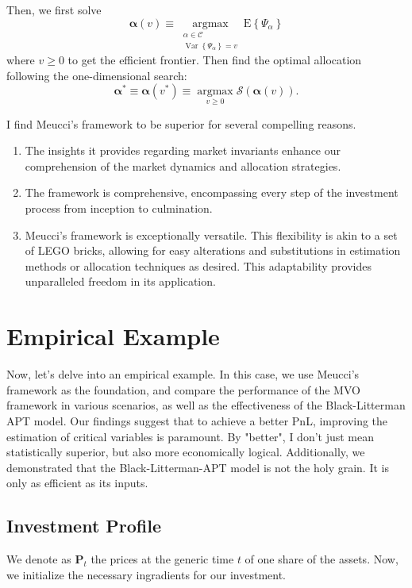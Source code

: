 \documentclass[13pt]{article}
\theoremstyle{definition}
\theoremstyle{remark}
\newenvironment{remark}
  {\pushQED{\qed}\renewcommand{\qedsymbol}{$\triangle$}\remarkx}
  {\popQED\endremarkx}
\begin{document}
Then, we first solve 
$$
\boldsymbol{\alpha}(v) \equiv \underset{\substack{\alpha \in \mathcal{C} \\ \operatorname{Var}\left\{\Psi_\alpha\right\}=v}}{\operatorname{argmax}} \mathrm{E}\left\{\Psi_\alpha\right\}
$$
where $v \geq 0$ to get the efficient frontier. Then find the optimal allocation following the one-dimensional search:
$$
\boldsymbol{\alpha}^* \equiv \boldsymbol{\alpha}\left(v^*\right) \equiv \underset{v \geq 0}{\operatorname{argmax}} \mathcal{S}(\boldsymbol{\alpha}(v)).
$$


\begin{remark}
    I find Meucci's framework to be superior for several compelling reasons.
    \begin{enumerate}
        \item The insights it provides regarding market invariants enhance our comprehension of the market dynamics and allocation strategies.
        \item The framework is comprehensive, encompassing every step of the investment process from inception to culmination.
        \item Meucci's framework is exceptionally versatile. This flexibility is akin to a set of LEGO bricks, allowing for easy alterations and substitutions in estimation methods or allocation techniques as desired. This adaptability provides unparalleled freedom in its application.
    \end{enumerate}


\end{remark}





\newpage
\section{Empirical Example}
Now, let's delve into an empirical example. In this case, we use Meucci's framework as the foundation, and compare the performance of the MVO framework in various scenarios, as well as the effectiveness of the Black-Litterman APT model. Our findings suggest that to achieve a better PnL, improving the estimation of critical variables is paramount. By "better", I don't just mean statistically superior, but also more economically logical. Additionally, we demonstrated that the Black-Litterman-APT model is not the holy grain. It is only as efficient as its inputs.

\subsection{Investment Profile}
We denote as $\mathbf{P}_t$ the prices at the generic time $t$ of one share of the assets. Now, we initialize the necessary ingradients for our investment.
\end{document}
